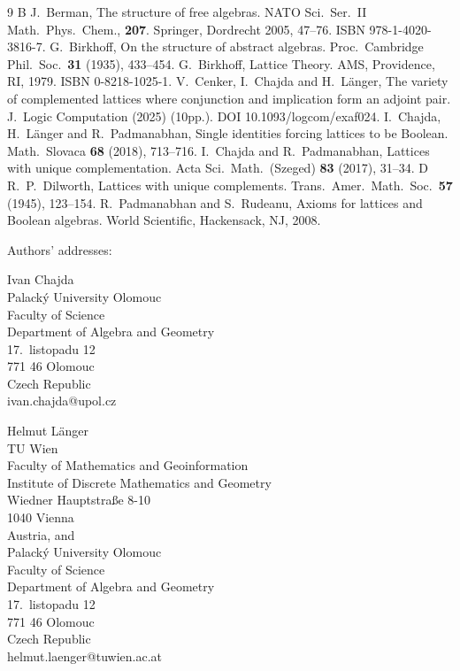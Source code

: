 \documentclass[12pt]{article}
\begin{document}


\begin{thebibliography}9
\bibitem B
J.~Berman, The structure of free algebras. NATO Sci.\ Ser.\ II Math.\ Phys.\ Chem., {\bf207}. Springer, Dordrecht 2005, 47--76. ISBN 978-1-4020-3816-7.
G.~Birkhoff, On the structure of abstract algebras. Proc.\ Cambridge Phil.\ Soc.\ {\bf31} (1935), 433--454.
G.~Birkhoff, Lattice Theory. AMS, Providence, RI, 1979. ISBN 0-8218-1025-1.
V.~Cenker, I.~Chajda and H.~L\"anger, The variety of complemented lattices where conjunction and implication form an adjoint pair. J.\ Logic Computation (2025) (10pp.). DOI 10.1093/logcom/exaf024.
I.~Chajda, H.~L\"anger and R.~Padmanabhan, Single identities forcing lattices to be Boolean. Math.\ Slovaca {\bf68} (2018), 713--716.
I.~Chajda and R.~Padmanabhan, Lattices with unique complementation. Acta Sci.\ Math.\ (Szeged) {\bf83} (2017), 31--34.
\bibitem D
R.~P.~Dilworth, Lattices with unique complements. Trans.\ Amer.\ Math.\ Soc.\ {\bf57} (1945), 123--154.
R.~Padmanabhan and S.~Rudeanu, Axioms for lattices and Boolean algebras. World Scientific, Hackensack, NJ, 2008.
\end{thebibliography}

Authors' addresses:

Ivan Chajda \\
Palack\'y University Olomouc \\
Faculty of Science \\
Department of Algebra and Geometry \\
17.\ listopadu 12 \\
771 46 Olomouc \\
Czech Republic \\
ivan.chajda@upol.cz

Helmut L\"anger \\
TU Wien \\
Faculty of Mathematics and Geoinformation \\
Institute of Discrete Mathematics and Geometry \\
Wiedner Hauptstra\ss e 8-10 \\
1040 Vienna \\
Austria, and \\
Palack\'y University Olomouc \\
Faculty of Science \\
Department of Algebra and Geometry \\
17.\ listopadu 12 \\
771 46 Olomouc \\
Czech Republic \\
helmut.laenger@tuwien.ac.at
\end{document}
